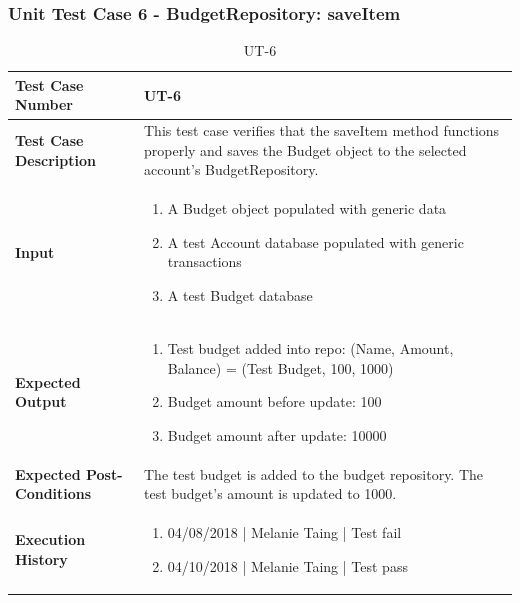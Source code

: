 \documentclass[12pt]{article}
\begin{document}
\subsubsection{Unit Test Case 6 - BudgetRepository: saveItem}
\def\arraystretch{1.5}%
\begin{table}[htbp]
\centering
\caption {UT-6}
\label{UT-6}
\begin{tabularx}{\textwidth}{ | l | X |}
\hline
\textbf{Test Case Number}      &  UT-6                         \\ \hline
\textbf{Test Case Description}    &  This test case verifies that the saveItem method functions properly and saves the Budget object to the selected account's BudgetRepository.         \\ \hline
\textbf{Input}         & 	\begin{enumerate}
	\item A Budget object populated with generic data
	\item A test Account database populated with generic transactions
	\item A test Budget database
\end{enumerate} \\ \hline
\textbf{Expected Output}     & \begin{enumerate}
	\item Test budget added into repo: (Name, Amount, Balance) = (Test Budget, 100, 1000)
	\item Budget amount before update: 100
	\item Budget amount after update: 10000
\end{enumerate} \\ \hline
\textbf{Expected Post-Conditions}           & The test budget is added to the budget repository. The test budget's amount is updated to 1000.        \\ \hline
\textbf{Execution History}   &  \begin{enumerate}
	\item 04/08/2018 | Melanie Taing | Test fail
	\item 04/10/2018 | Melanie Taing | Test pass
\end {enumerate} \\ \hline
\end{tabularx}
\end{table}
\clearpage

\end{document}
